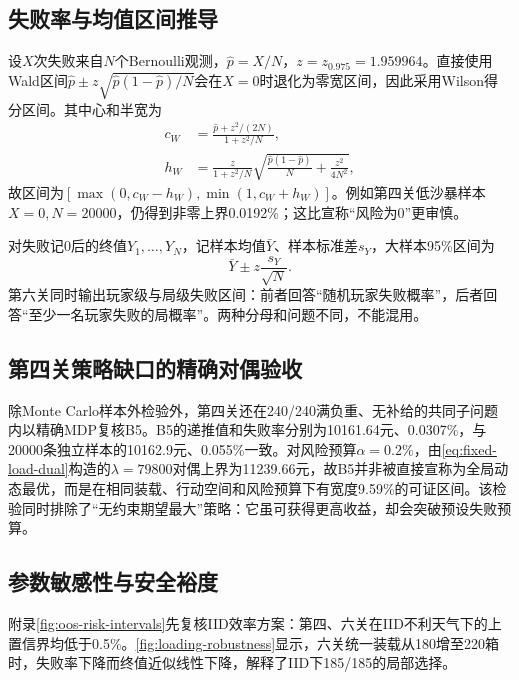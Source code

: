 \subsection{失败率与均值区间推导}

设$X$次失败来自$N$个Bernoulli观测，$\widehat p=X/N$，$z=z_{0.975}=1.959964$。直接使用Wald区间$\widehat p\pm z\sqrt{\widehat p(1-\widehat p)/N}$会在$X=0$时退化为零宽区间，因此采用Wilson得分区间。其中心和半宽为
\begin{align}
c_W&=\frac{\widehat p+z^2/(2N)}{1+z^2/N},\label{eq:wilson-center}\\
h_W&=\frac{z}{1+z^2/N}
\sqrt{\frac{\widehat p(1-\widehat p)}{N}+\frac{z^2}{4N^2}},
\label{eq:wilson-halfwidth}
\end{align}
故区间为$[\max(0,c_W-h_W),\min(1,c_W+h_W)]$。例如第四关低沙暴样本$X=0,N=20000$，仍得到非零上界0.0192\%；这比宣称“风险为0”更审慎。

对失败记0后的终值$Y_1,\ldots,Y_N$，记样本均值$\bar Y$、样本标准差$s_Y$，大样本95\%区间为
\begin{equation}
\bar Y\pm z\frac{s_Y}{\sqrt N}.
\label{eq:mean-confidence-interval}
\end{equation}
第六关同时输出玩家级与局级失败区间：前者回答“随机玩家失败概率”，后者回答“至少一名玩家失败的局概率”。两种分母和问题不同，不能混用。

\subsection{第四关策略缺口的精确对偶验收}

除Monte Carlo样本外检验外，第四关还在240/240满负重、无补给的共同子问题内以精确MDP复核B5。B5的递推值和失败率分别为10161.64元、0.0307\%，与20000条独立样本的10162.9元、0.055\%一致。对风险预算$\alpha=0.2\%$，由\cref{eq:fixed-load-dual}构造的$\lambda=79800$对偶上界为11239.66元，故B5并非被直接宣称为全局动态最优，而是在相同装载、行动空间和风险预算下有宽度9.59\%的可证区间。该检验同时排除了“无约束期望最大”策略：它虽可获得更高收益，却会突破预设失败预算。

\subsection{参数敏感性与安全裕度}

附录\cref{fig:oos-risk-intervals}先复核IID效率方案：第四、六关在IID不利天气下的上置信界均低于0.5\%。\cref{fig:loading-robustness}显示，六关统一装载从180增至220箱时，失败率下降而终值近似线性下降，解释了IID下185/185的局部选择。

